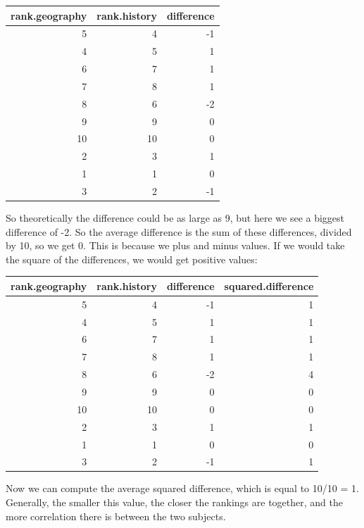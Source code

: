\documentclass[]{report}\usepackage[]{graphicx}\usepackage[]{color}
\newenvironment{knitrout}{}{} %
\begin{document}
\begin{knitrout}
\color{fgcolor}
\begin{tabular}{r|r|r}
\hline
rank.geography & rank.history & difference\\
\hline
5 & 4 & -1\\
\hline
4 & 5 & 1\\
\hline
6 & 7 & 1\\
\hline
7 & 8 & 1\\
\hline
8 & 6 & -2\\
\hline
9 & 9 & 0\\
\hline
10 & 10 & 0\\
\hline
2 & 3 & 1\\
\hline
1 & 1 & 0\\
\hline
3 & 2 & -1\\
\hline
\end{tabular}


\end{knitrout}

So theoretically the difference could be as large as 9, but here we see a biggest difference of -2. So the average difference is the sum of these differences, divided by 10, so we get 0. This is because we plus and minus values. If we would take the square of the differences, we would get positive values:

\begin{knitrout}
\color{fgcolor}
\begin{tabular}{r|r|r|r}
\hline
rank.geography & rank.history & difference & squared.difference\\
\hline
5 & 4 & -1 & 1\\
\hline
4 & 5 & 1 & 1\\
\hline
6 & 7 & 1 & 1\\
\hline
7 & 8 & 1 & 1\\
\hline
8 & 6 & -2 & 4\\
\hline
9 & 9 & 0 & 0\\
\hline
10 & 10 & 0 & 0\\
\hline
2 & 3 & 1 & 1\\
\hline
1 & 1 & 0 & 0\\
\hline
3 & 2 & -1 & 1\\
\hline
\end{tabular}


\end{knitrout}

Now we can compute the average squared difference, which is equal to 10/10 = 1. Generally, the smaller this value, the closer the rankings are together, and the more correlation there is between the two subjects. 
\end{document}
